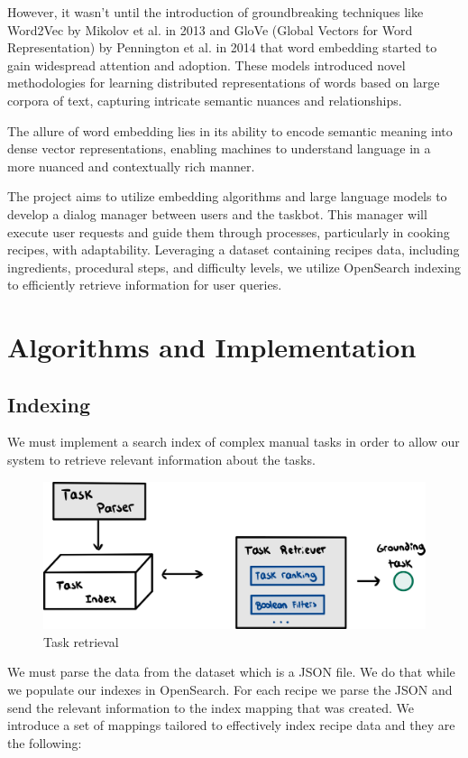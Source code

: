 \documentclass[runningheads]{llncs}
\begin{document}
However, it wasn't until the introduction of groundbreaking techniques like Word2Vec by Mikolov et al. in 2013 and GloVe (Global Vectors for Word Representation) by Pennington et al. in 2014 that word embedding started to gain widespread attention and adoption. These models introduced novel methodologies for learning distributed representations of words based on large corpora of text, capturing intricate semantic nuances and relationships.

The allure of word embedding lies in its ability to encode semantic meaning into dense vector representations, enabling machines to understand language in a more nuanced and contextually rich manner.

The project aims to utilize embedding algorithms and large language models to develop a dialog manager between users and the taskbot. This manager will execute user requests and guide them through processes, particularly in cooking recipes, with adaptability. Leveraging a dataset containing recipes data, including ingredients, procedural steps, and difficulty levels, we utilize OpenSearch indexing to efficiently retrieve information for user queries.


\section{Algorithms and Implementation}
\subsection{Indexing}
We must implement a search index of complex manual tasks in order to allow our system to retrieve relevant information about the tasks.

\begin{figure}[!htbp]
    \center
    \includegraphics[scale=0.08]{images/task_retriever.jpg}
    \caption{Task retrieval}
\end{figure}

We must parse the data from the dataset which is a JSON file. We do that while we populate our indexes in OpenSearch. For each recipe we parse the JSON and send the relevant information to the index mapping that was created. We introduce a set of mappings tailored to effectively index recipe data and they are the following:
\end{document}
